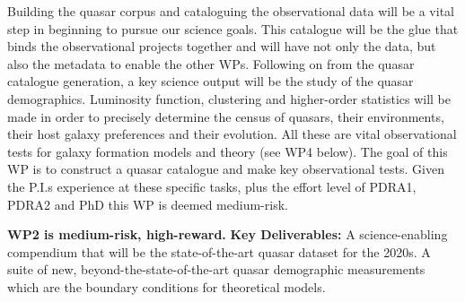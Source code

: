 \smallskip
\smallskip
\noindent
Building the quasar corpus and cataloguing the observational data will
be a vital step in beginning to pursue our science goals. This
catalogue will be the glue that binds the observational projects
together and will have not only the data, but also the metadata to
enable the other WPs.  Following on from the quasar catalogue
generation, a key science output will be the study of the quasar
demographics.  Luminosity function, clustering and higher-order
statistics will be made in order to precisely determine the census of
quasars, their environments, their host galaxy preferences and their
evolution. All these are vital observational tests for galaxy
formation models and theory (see WP4 below). The goal of this WP is to
construct a quasar catalogue and make key observational tests.
Given the P.I.s experience at these specific tasks, plus the effort
level of PDRA1, PDRA2 and PhD this WP is deemed medium-risk.

\smallskip
\smallskip
\noindent
{\bf WP2 is medium-risk, high-reward.}  {\bf Key Deliverables:} A
science-enabling compendium that will be the state-of-the-art quasar
dataset for the 2020s.  A suite of new, beyond-the-state-of-the-art
quasar demographic measurements which are the boundary conditions for
theoretical models.


